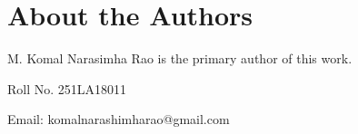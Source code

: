 \documentclass[10pt,letterpaper,twocolumn]{article}
\begin{document}
\section*{About the Authors}

M. Komal Narasimha Rao is the primary author of this work.

Roll No. 251LA18011

Email: komalnarashimharao@gmail.com

\balance



\end{document}
